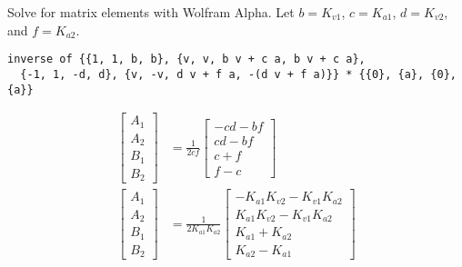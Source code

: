 Solve for matrix elements with Wolfram Alpha. Let
$b = K_{v1}$, $c = K_{a1}$, $d = K_{v2}$, and $f = K_{a2}$.
\begin{verbatim}
inverse of {{1, 1, b, b}, {v, v, b v + c a, b v + c a},
  {-1, 1, -d, d}, {v, -v, d v + f a, -(d v + f a)}} * {{0}, {a}, {0}, {a}}
\end{verbatim}
\begin{align*}
  \begin{bmatrix}
    A_1 \\
    A_2 \\
    B_1 \\
    B_2
  \end{bmatrix} &= \frac{1}{2cf}
  \begin{bmatrix}
    -cd - bf \\
    cd - bf \\
    c + f \\
    f - c
  \end{bmatrix} \\
  \begin{bmatrix}
    A_1 \\
    A_2 \\
    B_1 \\
    B_2
  \end{bmatrix} &= \frac{1}{2 K_{a1} K_{a2}}
  \begin{bmatrix}
    -K_{a1} K_{v2} - K_{v1} K_{a2} \\
    K_{a1} K_{v2} - K_{v1} K_{a2} \\
    K_{a1} + K_{a2} \\
    K_{a2} - K_{a1}
  \end{bmatrix}
\end{align*}

